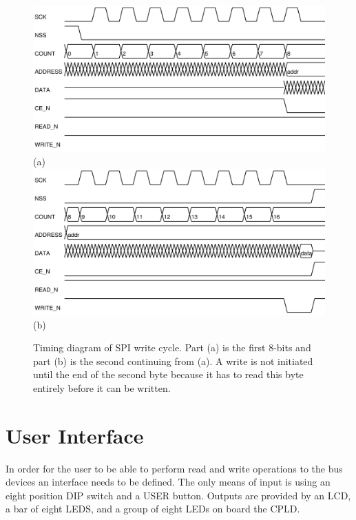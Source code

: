 \documentclass{article}
\begin{document}
\begin{figure}
\center
\includegraphics[scale=0.7]{figures/spi_ctl-timing/write-byte1} \\
(a) \\
\includegraphics[scale=0.7]{figures/spi_ctl-timing/write-byte2} \\
(b)
\caption{Timing diagram of SPI write cycle.
Part (a) is the first 8-bits and part (b) is the second
continuing from (a).
A write is not initiated until the end of the
second byte because it has to read this byte entirely before it can be written.}
\label{fig:spi_write}
\end{figure}

\clearpage


\section{User Interface}

In order for the user to be able to perform read and write
operations to the bus devices an interface needs to be defined.
The only means of input is using an eight position DIP switch
and a USER button.
Outputs are provided by an LCD, a bar of eight LEDS,
and a group of eight LEDs on board the CPLD.
\end{document}
